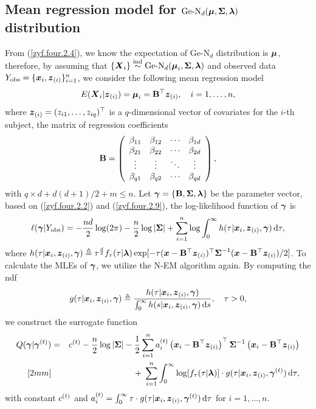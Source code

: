 \subsection{Mean regression model for $\GeN$ distribution}       %

From (\ref{zyf.four.2.4}), we know the expectation of Ge-N$_d$ distribution is $\bmu$, therefore, by assuming that $\{\ibX_i\} \ind \mbox{Ge-N}_d(\bmu_i, \bSi, \bla)$ and observed data $\Y{obs} = \{\ibx_i, \ibzi\}_{i=1}^n$, we consider the following mean regression model
\begin{eqnarray}    \label{zyf.four.2.9}
    E(\ibX_i | \ibzi) = \bmu_i = \bB^\top \ibzi, \quad i = 1, \dots, n,
\end{eqnarray}
where $\ibzi = (z_{i1}, \dots, z_{iq})^\top$ is a $q$-dimensional vector of covariates for the $i$-th subject, the matrix of regression coefficients
\begin{eqnarray*}
    \bB = \left(
    \begin{array}{cccc}
        \be_{11} & \be_{12} & \cdots & \be_{1d} \\ 
        \be_{21} & \be_{22} & \cdots & \be_{2d} \\ 
        \vdots   & \vdots   & \ddots & \vdots   \\
        \be_{q1} & \be_{q2} & \cdots & \be_{qd}
    \end{array}
    \right),
\end{eqnarray*}
with $q \times d + d(d + 1) / 2 + m \le n$. Let $\bga = \{ \bB, \bSi, \bla\}$ be the parameter vector, based on (\ref{zyf.four.2.2}) and (\ref{zyf.four.2.9}), the log-likelihood function of $\bga$ is
\begin{eqnarray}    \label{zyf.four.2.10}
    \ell(\bga | \Y{obs}) = -\frac{nd}{2} \log(2\pi) - \frac{n}{2} \log|\bSi| + \sum_{i=1}^n \log \int_0^\infty h(\tau | \ibx_i, \ibzi, \bga) \rd \tau,
\end{eqnarray}
where $h(\tau | \ibx_i, \ibzi, \bga) \teq \tau^\frac{d}{2} f_\tau(\tau|\bla) \exp[-\tau(\ibx - \bB^\top \ibzi)^\top \bSi^{-1} (\ibx - \bB^\top \ibzi) / 2]$. To calculate the MLEs of $\bga$, we utilize the N-EM algorithm again. By computing the ndf
$$
    g(\tau | \ibx_i, \ibzi, \bga) \teq \frac{h(\tau | \ibx_i, \ibzi, \bga)}{\int_0^\infty h(s | \ibx_i, \ibzi, \bga) \rd s}, \quad \tau > 0, 
$$
we construct the surrogate function 
\begin{eqnarray*}
    Q(\bga | \bgat) &=& \ct{} - \frac{n}{2} \log|\bSi| - \frac{1}{2} \sum_{i=1}^n \at{i} \left(\ibx_i - \bB^\top \ibzi \right)^\top \bSi^{-1} \left(\ibx_i - \bB^\top \ibzi \right) \\ [2mm]
    && +\; \sum_{i=1}^n \int_0^\infty \log[f_\tau(\tau | \bla)] \cdot g(\tau | \ibx_i, \ibzi, \bgat) \rd \tau,
\end{eqnarray*}
with constant $\ct{}$ and $\at{i} = \int_0^\infty \tau \cdot g(\tau | \ibx_i, \ibzi, \bgat) \rd \tau$ for $i = 1, \dots, n$.

